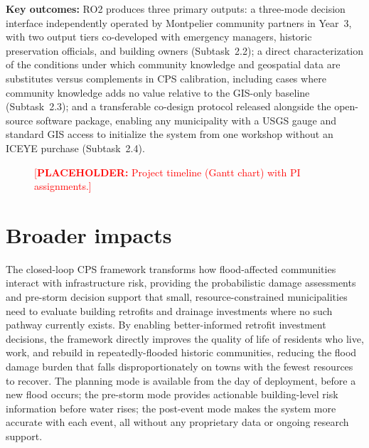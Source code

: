 \documentclass[11pt]{article}
\newcommand{\placeholder}[1]{\textcolor{red}{[\textbf{PLACEHOLDER:} #1]}}
\begin{document}
\textbf{Key outcomes:} RO2 produces three primary outputs: a three-mode decision
interface independently operated by Montpelier community partners in Year~3, with
two output tiers co-developed with emergency managers, historic preservation
officials, and building owners (Subtask~2.2); a direct characterization of the
conditions under which community knowledge and geospatial data are substitutes
versus complements in CPS calibration, including cases where community knowledge
adds no value relative to the GIS-only baseline (Subtask~2.3); and a transferable
co-design protocol released alongside the open-source software package, enabling
any municipality with a USGS gauge and standard GIS access to initialize the system
from one workshop without an ICEYE purchase (Subtask~2.4).

\begin{figure}
\vspace{-0.3cm}
\captionsetup{justification=centering,singlelinecheck=false,font=small}
\vspace{-0.9cm}
\caption{\placeholder{Project timeline (Gantt chart) with PI assignments.}}
\label{fig:timeline}
\vspace{-0.4cm}
\end{figure}


\section{Broader impacts}

The closed-loop CPS framework transforms how flood-affected communities interact
with infrastructure risk, providing the probabilistic damage assessments and
pre-storm decision support that small, resource-constrained municipalities need
to evaluate building retrofits and drainage investments where no such pathway
currently exists.
By enabling better-informed retrofit investment decisions, the framework directly
improves the quality of life of residents who live, work, and rebuild in
repeatedly-flooded historic communities, reducing the flood damage burden that
falls disproportionately on towns with the fewest resources to recover.
The planning mode is available from the day of deployment, before a new flood
occurs; the pre-storm mode provides actionable building-level risk information
before water rises; the post-event mode makes the system more accurate with each
event, all without any proprietary data or ongoing research support.
\end{document}
